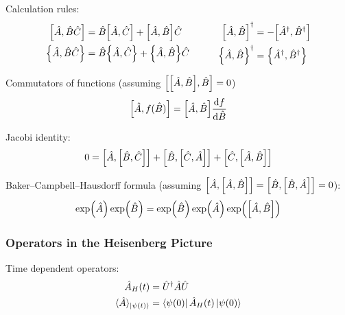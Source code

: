 			\noindent
			Calculation rules:
			\begin{equation}
				\begin{aligned}
					\comm{\hat{A}}{\hat{B}\hat{C}}
					&= \hat{B}\comm{\hat{A}}{\hat{C}} + \comm{\hat{A}}{\hat{B}}\hat{C} \\
					\acomm{\hat{A}}{\hat{B}\hat{C}}
					&= \hat{B}\acomm{\hat{A}}{\hat{C}} + \acomm{\hat{A}}{\hat{B}}\hat{C} \\
				\end{aligned}
				\hsp
				\begin{aligned}
					\comm{\hat{A}}{\hat{B}}^\dagger &= -\comm{\hat{A}^\dagger}{\hat{B}^\dagger} \\
					\acomm{\hat{A}}{\hat{B}}^\dagger &= \acomm{\hat{A}^\dagger}{\hat{B}^\dagger} \\
				\end{aligned}
			\end{equation}

			\noindent
			Commutators of functions (assuming $\comm{\comm{\hat{A}}{\hat{B}}}{\hat{B}}=0$)
			\begin{equation}
				\comm{\hat{A}}{f(\hat{B})}
				= \comm{\hat{A}}{\hat{B}}\dv{f}{\hat{B}}(\hat{B}) \\
			\end{equation}

			\noindent
			Jacobi identity:
			\begin{equation}
				0 = \comm{\hat{A}}{\comm{\hat{B}}{\hat{C}}} + \comm{\hat{B}}{\comm{\hat{C}}{\hat{A}}} + \comm{\hat{C}}{\comm{\hat{A}}{\hat{B}}}
			\end{equation}


			\noindent
			Baker--Campbell--Hausdorff formula (assuming $\comm{\hat{A}}{\comm{\hat{A}}{\hat{B}}} = \comm{\hat{B}}{\comm{\hat{B}}{\hat{A}}} = 0$):
			\begin{equation}
				\exp(\hat{A})\exp(\hat{B}) = \exp(\hat{B}) \exp(\hat{A}) \exp(\comm{\hat{A}}{\hat{B}})
			\end{equation}

		\subsubsection{Operators in the Heisenberg Picture}
			\noindent
			Time dependent operators:
			\begin{equation}
				\begin{aligned}
					\hat{A}_H(t) &= \hat{U}^\dagger \hat{A} \hat{U} \\
					\langle \hat{A} \rangle_{\Ket{\psi(t)}} &= \Bra{\psi(0)}\hat{A}_H(t)\Ket{\psi(0)}
				\end{aligned}
			\end{equation}


